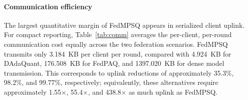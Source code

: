\documentclass[conference,a4paper]{IEEEtran}
\begin{document}
\begin{table}[ht]
\centering
\footnotesize
\caption{Average communication cost per client per round across the two
federation scales, in decimal KB ($10^{3}$~B).}
\label{tab:comm}

\end{table}

\paragraph{Communication efficiency}
The largest quantitative margin of FedMPSQ appears in serialized client
uplink. For compact reporting, Table~\ref{tab:comm} averages the per-client,
per-round communication cost equally across the two federation scenarios.
FedMPSQ transmits only 3.184~KB per client per round, compared with 4.924~KB
for DAdaQuant, 176.508~KB for FedPAQ, and 1397.020~KB for dense model
transmission. This corresponds to uplink reductions of approximately 35.3\%,
98.2\%, and 99.77\%, respectively; equivalently, these alternatives require approximately
1.55$\times$, 55.4$\times$, and 438.8$\times$ as much uplink as FedMPSQ.
\end{document}
